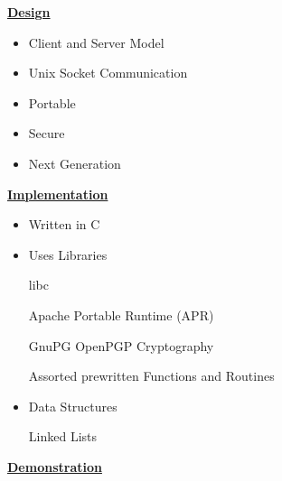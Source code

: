 \documentclass[a4,12pt]{seminar}
\newcommand{\SlideTitle}[1]{\Large \underline{\textbf{#1}}\normalsize}
\begin{document}
\begin{slide}{\SlideTitle{Design}}

\begin{itemize}

\item Client and Server Model

\item Unix Socket Communication

\item Portable

\item Secure

\item Next Generation 

\end{itemize}

\vfill

\end{slide}


\begin{slide}{\SlideTitle{Implementation}}

\begin{itemize}

\item Written in C

\item Uses Libraries

\subitem libc

\subitem Apache Portable Runtime (APR)

\subitem GnuPG OpenPGP Cryptography

\subitem Assorted prewritten Functions and Routines

\item Data Structures

\subitem Linked Lists

\end{itemize}

\vfill

\end{slide}


\begin{slide}{\SlideTitle{Demonstration}}

\vspace{25mm}

\begin{center}
\end{center}

\vfill

\end{slide}
\end{document}
